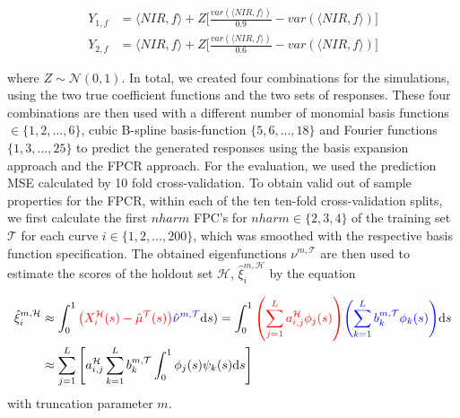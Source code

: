 \documentclass[11pt,twoside,a4paper]{article}
\begin{document}
		\begin{equation}
			\begin{split}
				Y_{1,f} & = \langle NIR, f\rangle + Z  \biggl\lbrack\frac{var(\langle NIR, f\rangle)}{0.9} - var(\langle NIR, f\rangle)\biggr\rbrack \\
				Y_{2,f} & = \langle NIR, f\rangle + Z  \biggl\lbrack\frac{var(\langle NIR, f\rangle)}{0.6} - var(\langle NIR, f\rangle)\biggr\rbrack
			\end{split}
		\end{equation}
		
		where $Z \sim \mathcal{N}(0,1)$. In total, we created four combinations for the simulations, using the two true coefficient functions and the two sets of responses. These four combinations are then used with a different number of monomial basis functions $ \in \{1,2, \dots, 6\}$, cubic B-spline basis-function $\{5,6,...,18\}$ and Fourier functions $\{1,3,...,25\}$ to predict the generated responses using the basis expansion approach and the FPCR approach. For the evaluation, we used the prediction MSE calculated by 10 fold cross-validation.
		To obtain valid out of sample properties for the FPCR, within each of the ten ten-fold cross-validation splits, we first calculate the first $nharm$ FPC's for $nharm \in \{2,3,4\}$ of the training set $\mathcal{T}$ for each curve $i \in \{1,2, \dots, 200\}$, which was smoothed with the respective basis function specification. The obtained eigenfunctions $\nu^{m,\mathcal{T}}$ are then used to estimate the scores of the holdout set $\mathcal{H}$, $\hat{\xi}_{i}^{m, \mathcal{H}}$  by the equation
		 
		\begin{equation}
			\begin{split}
				\hat{\xi}_{i}^{m, \mathcal{H}} &\approx  \int_{0}^{1} {\color{red} \left(X_{i}^{\mathcal{H}}(s) - \hat{\mu}^{\mathcal{T}}(s)\right)} {\color{blue}\hat{\nu}^{m, \mathcal{T}} }\mathrm{d}s) 
			    = \int_{0}^{1} {\color{red}\left(\sum_{j = 1}^{L} a_{i,j}^{\mathcal{H}} \phi_j(s)\right)} {\color{blue}\left(\sum_{k = 1}^{L} b_{k}^{m, \mathcal{T}} \phi_{k}(s)\right)} \mathrm{d}s \\
				 &\approx \sum_{j = 1}^{L} \left[ a_{i,j}^{\mathcal{H}}\sum_{k = 1}^{L}  b_{k}^{m, \mathcal{T}} \int_{0}^{1} \phi_j(s) \psi_{k}(s)\mathrm{d}s\right]
			\end{split}
		\end{equation}
		with truncation parameter $m$.
		\vspace{0.2cm}
	
\end{document}
